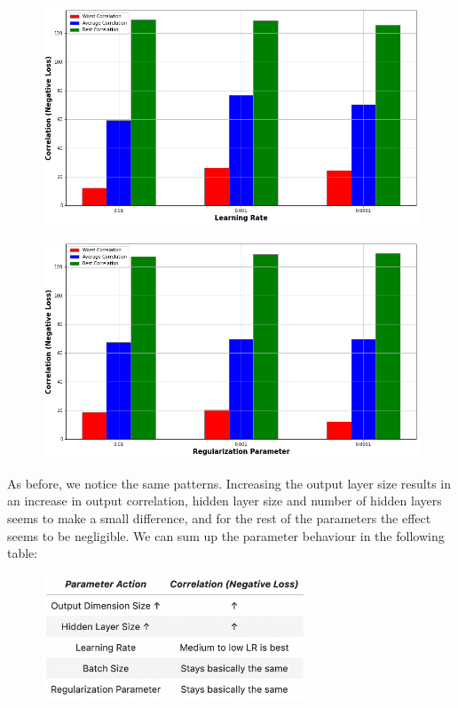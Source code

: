 {\begin{figure}[H]
    \caption{}
\end{figure}
\begin{figure}[H]
    \centering
    \includegraphics[width=\textwidth]{figures/DCCA_optimizations/MCA_Learning.png}
    \caption{}
\end{figure}
\begin{figure}[H]
    \centering
    \includegraphics[width=\textwidth]{figures/DCCA_optimizations/MCA_Regularization.png}
    \caption{}
\end{figure}

As before, we notice the same patterns. Increasing the output layer size results in an increase in output correlation, hidden layer size and number of hidden layers seems to make a small difference, and for the rest of the parameters the effect seems to be negligible. We can sum up the parameter behaviour in the following table:
\begin{figure}[H]
    \centering
    \includegraphics[width=0.7\textwidth]{figures/DCCA_optimizations/MCA_Conclusions.png}
    \caption{}
\end{figure}


}
